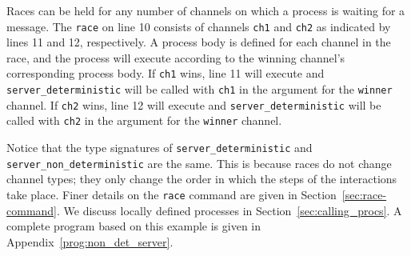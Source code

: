 \documentclass[acmsmall]{acmart}
\begin{document}
Races can be held for any number of channels on which a process is waiting for a message.
The \lstinline$race$ on line 10 consists of channels \lstinline$ch1$ and \lstinline$ch2$ as indicated by lines 11 and 12, respectively.
A process body is defined for each channel in the race, and the process will execute according to the winning channel's corresponding process body.
If \lstinline$ch1$ wins, line 11 will execute and \lstinline$server_deterministic$ will be called with \lstinline$ch1$ in the argument for the  \lstinline$winner$ channel.
If \lstinline$ch2$ wins, line 12 will execute and \lstinline$server_deterministic$ will be called with \lstinline$ch2$ in the argument for the \lstinline$winner$ channel.

Notice that the type signatures of \lstinline$server_deterministic$ and \lstinline$server_non_deterministic$ are the same. 
This is because races do not change channel types; they only change the order in which the steps of the interactions take place.
Finer details on the \lstinline$race$ command are given in Section~\ref{sec:race-command}.
We discuss locally defined processes in Section~\ref{sec:calling_procs}.
A complete program based on this example is given in Appendix~\ref{prog:non_det_server}.
\end{document}

